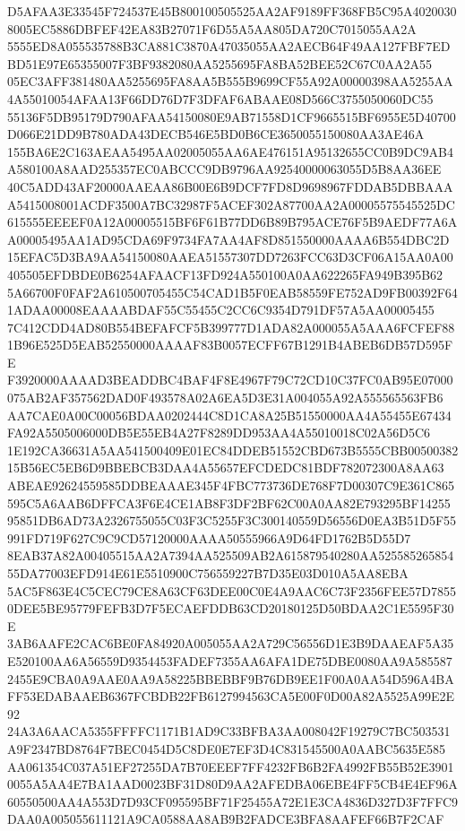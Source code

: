 \documentclass[UTF8,fontset=fandol,zihao=-4,a4paper]{ctexart}
\begin{document}
{{D5AFAA3E33545F724537E45B800100505525AA2AF9189FF368FB5C95A40200308005EC5886DBFEF42EA83B27071F6D55A5AA805DA720C7015055AA2A
5555ED8A055535788B3CA881C3870A47035055AA2AECB64F49AA127FBF7EDBD51E97E65355007F3BF9382080AA5255695FA8BA52BEE52C67C0AA2A55
05EC3AFF381480AA5255695FA8AA5B555B9699CF55A92A00000398AA5255AA4A55010054AFAA13F66DD76D7F3DFAF6ABAAE08D566C3755050060DC55
55136F5DB95179D790AFAA54150080E9AB71558D1CF9665515BF6955E5D40700D066E21DD9B780ADA43DECB546E5BD0B6CE3650055150080AA3AE46A
155BA6E2C163AEAA5495AA02005055AA6AE476151A95132655CC0B9DC9AB4A580100A8AAD255357EC0ABCCC9DB9796AA92540000063055D5B8AA36EE
40C5ADD43AF20000AAEAA86B00E6B9DCF7FD8D9698967FDDAB5DBBAAAA5415008001ACDF3500A7BC32987F5ACEF302A87700AA2A00005575545525DC
615555EEEEF0A12A00005515BF6F61B77DD6B89B795ACE76F5B9AEDF77A6AA00005495AA1AD95CDA69F9734FA7AA4AF8D851550000AAAA6B554DBC2D
15EFAC5D3BA9AA54150080AAEA51557307DD7263FCC63D3CF06A15AA0A00405505EFDBDE0B6254AFAACF13FD924A550100A0AA622265FA949B395B62
5A66700F0FAF2A610500705455C54CAD1B5F0EAB58559FE752AD9FB00392F641ADAA00008EAAAABDAF55C55455C2CC6C9354D791DF57A5AA00005455
7C412CDD4AD80B554BEFAFCF5B399777D1ADA82A000055A5AAA6FCFEF881B96E525D5EAB52550000AAAAF83B0057ECFF67B1291B4ABEB6DB57D595FE
F3920000AAAAD3BEADDBC4BAF4F8E4967F79C72CD10C37FC0AB95E07000075AB2AF357562DAD0F493578A02A6EA5D3E31A004055A92A555565563FB6
AA7CAE0A00C00056BDAA0202444C8D1CA8A25B51550000AA4A55455E67434FA92A5505006000DB5E55EB4A27F8289DD953AA4A55010018C02A56D5C6
1E192CA36631A5AA541500409E01EC84DDEB51552CBD673B5555CBB0050038215B56EC5EB6D9BBEBCB3DAA4A55657EFCDEDC81BDF782072300A8AA63
ABEAE92624559585DDBEAAAE345F4FBC773736DE768F7D00307C9E361C865595C5A6AAB6DFFCA3F6E4CE1AB8F3DF2BF62C00A0AA82E793295BF14255
95851DB6AD73A2326755055C03F3C5255F3C300140559D56556D0EA3B51D5F55991FD719F627C9C9CD57120000AAAA50555966A9D64FD1762B5D55D7
8EAB37A82A00405515AA2A7394AA525509AB2A615879540280AA52558526585455DA77003EFD914E61E5510900C756559227B7D35E03D010A5AA8EBA
5AC5F863E4C5CEC79CE8A63CF63DEE00C0E4A9AAC6C73F2356FEE57D78550DEE5BE95779FEFB3D7F5ECAEFDDB63CD20180125D50BDAA2C1E5595F30E
3AB6AAFE2CAC6BE0FA84920A005055AA2A729C56556D1E3B9DAAEAF5A35E520100AA6A56559D9354453FADEF7355AA6AFA1DE75DBE0080AA9A585587
2455E9CBA0A9AAE0AA9A58225BBEBBF9B76DB9EE1F00A0AA54D596A4BAFF53EDABAAEB6367FCBDB22FB6127994563CA5E00F0D00A82A5525A99E2E92
24A3A6AACA5355FFFFC1171B1AD9C33BFBA3AA008042F19279C7BC503531A9F2347BD8764F7BEC0454D5C8DE0E7EF3D4C831545500A0AABC5635E585
AA061354C037A51EF27255DA7B70EEEF7FF4232FB6B2FA4992FB55B52E39010055A5AA4E7BA1AAD0023BF31D80D9AA2AFEDBA06EBE4FF5CB4E4EF96A
60550500AA4A553D7D93CF095595BF71F25455A72E1E3CA4836D327D3F7FFC9DAA0A005055611121A9CA0588AA8AB9B2FADCE3BFA8AAFEF66B7F2CAF
}}
\end{document}
